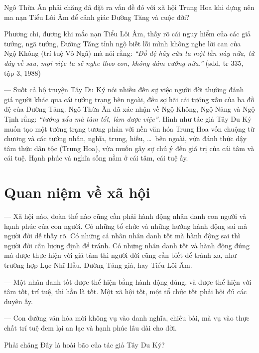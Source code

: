 Ngô Thừa Ân phải chăng đã đặt ra vấn đề đó với xã hội Trung Hoa khi dựng nên ma nạn Tiểu Lôi Âm để cảnh giác Đường Tăng và cuộc đời?

Phương chi, đương khi mắc nạn Tiểu Lôi Âm, thấy rõ cái nguy hiểm của các giả tướng, ngã tướng, Đường Tăng tỉnh ngộ biết lỗi mình không nghe lời can của Ngộ Không (trí tuệ Vô Ngã) mà nói rằng: \emph{``Đồ đệ hãy cứu ta một lần này nữa, từ đây về sau, mọi việc ta sẽ nghe theo con, không dám cưỡng nữa.''} (sđd, tr 335, tập 3, 1988)

— Suốt cả bộ truyện Tây Du Ký nói nhiều đến sự việc người đời thường đánh giá người khác qua cái tướng trạng bên ngoài, đều sợ hãi cái tướng xấu của ba đồ đệ của Đường Tăng. Ngô Thừa Ân đã xác nhận về Ngộ Không, Ngộ Năng và Ngộ Tịnh rằng: \emph{``tướng xấu mà tâm tốt, làm được việc''}. Hình như tác giả Tây Du Ký muốn tạo một tướng trạng tương phản với nền văn hóa Trung Hoa vốn chuộng từ chương và các tướng nhân, nghĩa, trung, hiếu, \ldots ~bên ngoài, vừa đánh thức dậy tâm thức dân tộc (Trung Hoa), vừa muốn gây sự chú ý đến giá trị của cái tâm và cái tuệ. Hạnh phúc và nghĩa sống nằm ở cái tâm, cái tuệ ấy.

\section{Quan niệm về xã hội} %
\label{sec:65_66_xa_hoi}

— Xã hội nào, đoàn thể nào cũng cần phải hành động nhân danh con người và hạnh phúc của con người. Có những tổ chức và những hướng hành động sai mà người đời dễ thấy rõ. Có những cá nhân nhân danh tốt mà hành động sai thì người đời cần lượng định để tránh. Có những nhân danh tốt và hành động đúng mà được thực hiện với giả tâm thì người đời cũng cần biết để tránh xa, như trường hợp Lục Nhĩ Hầu, Đường Tăng giả, hay Tiểu Lôi Âm.

— Một nhân danh tốt được thể hiện bằng hành động đúng, và được thể hiện với tâm tốt, trí tuệ, thì hẳn là tốt. Một xã hội tốt, một tổ chức tốt phải hội đủ các duyên ấy.

— Con đường văn hóa mới không vụ vào danh nghĩa, chiêu bài, mà vụ vào thực chất trí tuệ đem lại an lạc và hạnh phúc lâu dài cho đời.

Phải chăng Đây là hoài bão của tác giả Tây Du Ký?
